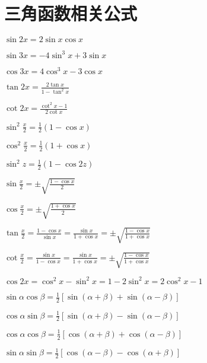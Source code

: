 \section{三角函数相关公式}

\begin{spacing}{\hangju}
    \begin{multicols}{2}
        \noindent $\sin{2x}=2\sin{x}\cos{x}$

        \noindent $\sin{3x}=-4\sin^3{x}+3\sin{x}$

        \noindent $\cos{3x}=4\cos^3{x}-3\cos{x}$

        \noindent $\tan{2x}=\frac{2\tan{x}}{1-\tan^2{x}}$

        \noindent $\cot{2x}=\frac{\cot^2{x}-1}{2\cot{x}}$

        \noindent $\sin^2{\frac{x}{2}}=\frac{1}{2}(1-\cos{x})$

        \noindent $\cos^2{\frac{x}{2}}=\frac{1}{2}(1+\cos{x})$

        \noindent $\sin^2{z}=\frac{1}{2}(1-\cos{2z})$

        \noindent $\sin{\frac{x}{2}}=\pm\sqrt{\frac{1-\cos{x}}{2}}$

        \noindent $\cos{\frac{x}{2}}=\pm\sqrt{\frac{1+\cos{x}}{2}}$

    \end{multicols}

    \noindent $\tan{\frac{x}{2}}=\frac{1-\cos{x}}{\sin{x}}=\frac{\sin{x}}{1+\cos{x}}=\pm\sqrt{\frac{1-\cos{x}}{1+\cos{x}}}$

    \noindent $\cot{\frac{x}{2}}=\frac{\sin{x}}{1-\cos{x}}=\frac{\sin{x}}{1+\cos{x}}=\pm\sqrt{\frac{1-\cos{x}}{1+\cos{x}}}$

    \noindent $\cos{2x}=\cos^2{x}-\sin^2{x}=1-2\sin^2{x}=2\cos^2{x}-1$

    \noindent $\sin{\alpha}\cos{\beta}=\frac{1}{2}[\sin{(\alpha+\beta)}+\sin{(\alpha-\beta)}]$

    \noindent $\cos{\alpha}\sin{\beta}=\frac{1}{2}[\sin{(\alpha+\beta)}-\sin{(\alpha-\beta)}]$

    \noindent $\cos{\alpha}\cos{\beta}=\frac{1}{2}[\cos{(\alpha+\beta)}+\cos{(\alpha-\beta)}]$

    \noindent $\sin{\alpha}\sin{\beta}=\frac{1}{2}[\cos{(\alpha-\beta)}-\cos{(\alpha+\beta)}]$

\end{spacing}